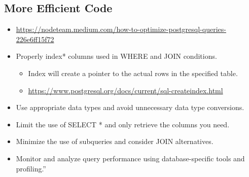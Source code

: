\documentclass[
  letterpaper,
  DIV=11,
  numbers=noendperiod]{scrreprt}
\providecommand{\tightlist}{%
  \setlength{\itemsep}{0pt}\setlength{\parskip}{0pt}}\usepackage{longtable,booktabs,array}
\begin{document}
\hypertarget{more-efficient-code}{%
\subsection{More Efficient Code}\label{more-efficient-code}}

\begin{itemize}
\tightlist
\item
  \url{https://nodeteam.medium.com/how-to-optimize-postgresql-queries-226e6ff15f72}
\item
  Properly index* columns used in WHERE and JOIN conditions.

  \begin{itemize}
  \tightlist
  \item
    Index will create a pointer to the actual rows in the specified
    table.
  \item
    \url{https://www.postgresql.org/docs/current/sql-createindex.html}
  \end{itemize}
\item
  Use appropriate data types and avoid unnecessary data type
  conversions.
\item
  Limit the use of SELECT * and only retrieve the columns you need.
\item
  Minimize the use of subqueries and consider JOIN alternatives.
\item
  Monitor and analyze query performance using database-specific tools
  and profiling.''
\end{itemize}



\printindex
\end{document}
